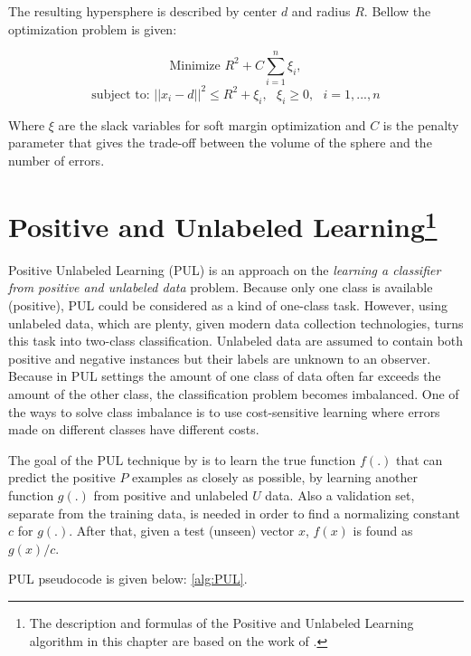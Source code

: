 The resulting hypersphere is described by center \(d\) and radius
\(R\). Bellow the optimization problem is given: 

\[ \textrm{Minimize } R^2 + C \sum_{i=1}^{n} \xi_i, \]
\[ \textrm{subject to: } || x_i - d ||^2 \leq R^2 + \xi_i, \textrm{ } \xi_i \geq 0, \textrm{ } i = 1, ..., n \]

Where \( \xi \) are the slack variables for soft margin optimization and \( C \)  is the penalty parameter that gives the trade-off between the volume of the sphere and the number of errors.

\section[Positive and Unlabeled Learning]{Positive and Unlabeled Learning\footnote{The description and formulas of the Positive and Unlabeled Learning algorithm in this chapter are based on the work of \cite{Elkan;Noto:2008}.}}\label{Chapter:PUL}

Positive Unlabeled Learning (PUL) is an approach on the \textit{learning a classifier from positive and unlabeled data} problem. Because only one class is available (positive), PUL could be considered as a kind of one-class task. However, using unlabeled data, which are plenty, given modern data collection technologies, turns this task into two-class classification. Unlabeled data are assumed to contain both positive and negative instances but their labels are unknown to an observer. Because in PUL settings the amount of one class of data often far exceeds the amount of the other class, the classification problem becomes imbalanced. One of the ways to solve class imbalance is to use cost-sensitive learning where errors made on different classes have different costs.

The goal of the PUL technique by \cite{Elkan;Noto:2008} is to learn the true function \(f(.)\) that can predict the positive \(P\) examples as closely as possible, by learning another function \(g(.)\) from positive and unlabeled \(U\) data. Also a validation set, separate from the training data, is needed in order to find a normalizing constant \(c\) for \(g(.)\). After that, given a test (unseen) vector \(x\), \(f(x)\) is found as \(g(x)/c\).

PUL pseudocode is given below: \ref{alg:PUL}. 

